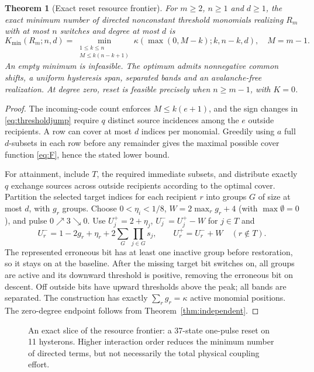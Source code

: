 \documentclass[12pt,letterpaper]{article}
\newtheorem{theorem}{Theorem}[section]
\theoremstyle{definition}\newtheorem{definition}[theorem]{Definition}
\theoremstyle{remark}\newtheorem{remark}[theorem]{Remark}
\newcommand{\Kmin}{K_{\min}}
\begin{document}
\begin{theorem}[Exact reset resource frontier]\label{thm:frontier}
For $m\ge2$, $n\ge1$ and $d\ge1$, the exact minimum number of directed nonconstant threshold monomials realizing $R_m$ with at most $n$ switches and degree at most $d$ is
\begin{equation}\label{eq:frontier}
\boxed{\Kmin(R_m;n,d)=\min_{\substack{1\le k\le n\\M\le k(n-k+1)}}\kappa(\max(0,M-k);k,n-k,d),}\quad M=m-1.
\end{equation}
An empty minimum is infeasible. The optimum admits nonnegative common shifts, a uniform hysteresis span, separated bands and an avalanche-free realization. At degree zero, reset is feasible precisely when $n\ge m-1$, with $K=0$.
\end{theorem}
\begin{proof}
The incoming-code count enforces $M\le k(e+1)$, and the sign changes in \eqref{eq:thresholdjump} require $q$ distinct source incidences among the $e$ outside recipients. A row can cover at most $d$ indices per monomial. Greedily using $a$ full $d$-subsets in each row before any remainder gives the maximal possible cover function \eqref{eq:F}, hence the stated lower bound.

For attainment, include $T$, the required immediate subsets, and distribute exactly $q$ exchange sources across outside recipients according to the optimal cover. Partition the selected target indices for each recipient $r$ into groups $G$ of size at most $d$, with $g_r$ groups. Choose $0<\eta_i<1/8$, $W=2\max_r g_r+4$ (with $\max\emptyset=0$), and pulse $0\nearrow3\searrow0$. Use $U_j^+=2+\eta_j$, $U_j^-=U_j^+-W$ for $j\in T$ and
\begin{equation}\label{eq:frontconstruct}
 U_r^-=1-2g_r+\eta_r+2\sum_G\prod_{j\in G}s_j,\qquad U_r^+=U_r^-+W \quad(r\notin T).
\end{equation}
The represented erroneous bit has at least one inactive group before restoration, so it stays on at the baseline. After the missing target bit switches on, all groups are active and its downward threshold is positive, removing the erroneous bit on descent. Off outside bits have upward thresholds above the peak; all bands are separated. The construction has exactly $\sum_rg_r=\kappa$ active monomial positions. The zero-degree endpoint follows from Theorem~\ref{thm:independent}.
\end{proof}

\begin{figure}[ht]
\centering\resizebox{\linewidth}{!}{}
\caption{An exact slice of the resource frontier: a 37-state one-pulse reset on 11 hysterons. Higher interaction order reduces the minimum number of directed terms, but not necessarily the total physical coupling effort.}
\label{fig:frontier}
\end{figure}
\end{document}
